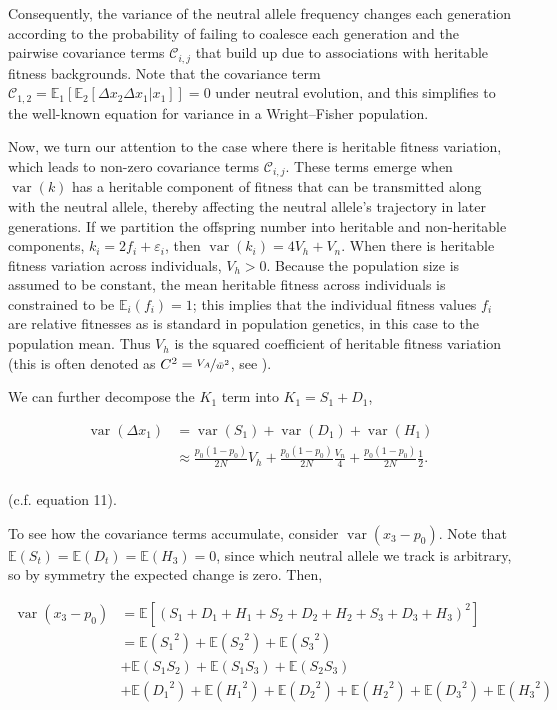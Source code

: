\documentclass[11pt]{article}
\newcommand{\E}{\mathbb{E}}
\DeclareMathOperator{\var}{var}
\begin{document}
Consequently, the variance of the neutral allele frequency changes each
generation according to the probability of failing to coalesce each generation
and the pairwise covariance terms $\mathcal{C}_{i,j}$ that build up due to associations
with heritable fitness backgrounds. Note that the covariance term $\mathcal{C}_{1,2} =
\E_1\left[\E_2[\Delta x_2 \Delta x_1 | x_1]\right] = 0$ under neutral
evolution, and this simplifies to the well-known equation for variance in a
Wright--Fisher population.

Now, we turn our attention to the case where there is heritable fitness
variation, which leads to non-zero covariance terms $\mathcal{C}_{i,j}$. These
terms emerge when $\var(k)$ has a heritable component of fitness that can be
transmitted along with the neutral allele, thereby affecting the neutral
allele's trajectory in later generations. If we partition the offspring number
into heritable and non-heritable components, $k_i = 2f_i + \varepsilon_i$, then
$\var(k_i) = 4 V_h + V_n$. When there is heritable fitness variation across
individuals, $V_h > 0$. Because the population size is assumed to be constant,
the mean heritable fitness across individuals is constrained to be $\E_i(f_i) =
1$; this implies that the individual fitness values $f_i$ are relative
fitnesses as is standard in population genetics, in this case to the population
mean. Thus $V_h$ is the squared coefficient of heritable fitness variation
(this is often denoted as $C^2 = \nicefrac{V_A}{\bar{w}^2}$, see
\cite{Crow1958-pc,Charlesworth1987-ab,Houle1992-ur}).

We can further decompose the $K_1$ term into $K_1 = S_1 + D_1$,

\begin{align}
  \var(\Delta x_1) &= \var(S_1) + \var(D_1) + \var(H_1) \\
  &\approx \frac{p_0(1-p_0)}{2N} V_h + \frac{p_0(1-p_0)}{2N} \frac{V_n}{4} + \frac{p_0(1-p_0)}{2N} \frac{1}{2}. \\
\end{align}

(c.f. \cite{Santiago1995-hx} equation 11).

To see how the covariance terms accumulate, consider $\var(x_3 - p_0)$. Note
that $\E(S_t) = \E(D_t) = \E(H_3) = 0$, since which neutral allele we track is
arbitrary, so by symmetry the expected change is zero. Then,

\begin{align}
  \label{eq:var_x}
  \var(x_3 - p_0) &= \E\left[ \left(S_1 + D_1 + H_1 + S_2 + D_2 + H_2 + S_3 + D_3 + H_3 \right)^2 \right] \\
                  &= \E({S_1}^2) + \E({S_2}^2) + \E({S_3}^2)  \\
                  &+ \E(S_1 S_2) + \E(S_1 S_3) + \E(S_2 S_3) \\
                  &+ \E({D_1}^2) + \E({H_1}^2) + \E({D_2}^2) + \E({H_2}^2) + \E({D_3}^2) + \E({H_3}^2)
\end{align}
\end{document}

